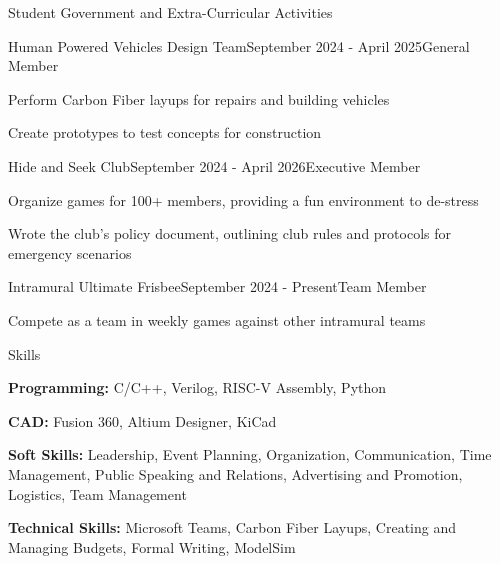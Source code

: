 \documentclass{resume}
\begin{document}
\begin{rSection}{Student Government and Extra-Curricular Activities}

\begin{rSubsection}{Human Powered Vehicles Design Team}{September 2024 - April 2025}{General Member}{}
\item Perform Carbon Fiber layups for repairs and building vehicles
\item Create prototypes to test concepts for construction
\end{rSubsection}


\begin{rSubsection}{Hide and Seek Club}{September 2024 - April 2026}{Executive Member}{}
\item Organize games for 100+ members, providing a fun environment to de-stress
\item Wrote the club's policy document, outlining club rules and protocols for emergency scenarios
\end{rSubsection}


\begin{rSubsection}{Intramural Ultimate Frisbee}{September 2024 - Present}{Team Member}{}
\item Compete as a team in weekly games against other intramural teams
\end{rSubsection}

\end{rSection}


\begin{rSection}{Skills} \itemsep -3pt  

\item {\bf Programming:} C/C++, Verilog, RISC-V Assembly, Python
\item {\bf CAD:} Fusion 360, Altium Designer, KiCad
\item {\bf Soft Skills:} Leadership, Event Planning, Organization, Communication, Time Management, Public Speaking and Relations, Advertising and Promotion, Logistics, Team Management
\item {\bf Technical Skills:} Microsoft Teams, Carbon Fiber Layups, Creating and Managing Budgets, Formal Writing, ModelSim

\end{rSection} 
\end{document}
